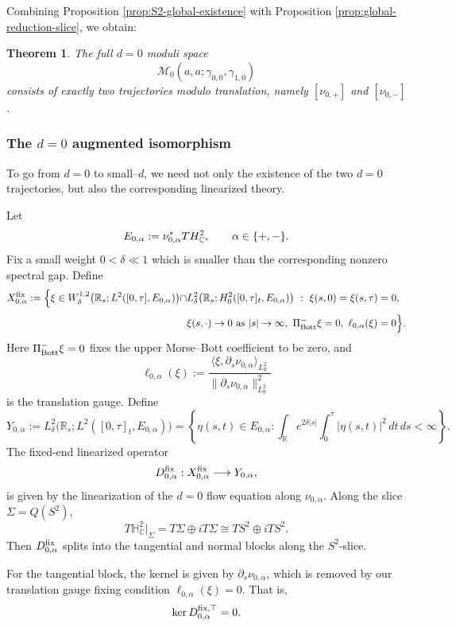 \documentclass[11pt]{amsart}
\theoremstyle{plain}
\newtheorem{thm}{Theorem}[section]
\theoremstyle{definition}
\newcommand{\R}{\mathbb{R}}
\newcommand{\C}{\mathbb{C}}
\newcommand{\HH}{\mathbb{H}}
\begin{document}
Combining Proposition \ref{prop:S2-global-existence} with Proposition \ref{prop:global-reduction-slice}, we obtain:

\begin{thm}\label{thm:exact-two-d0}
The full $d=0$ moduli space
\[
\mathcal{M}_0(a,a;\gamma_{0,0},\gamma_{1,0})
\]
consists of exactly two trajectories modulo translation, namely $[\nu_{0,+}]$ and $[\nu_{0,-}]$.
\end{thm}



\subsubsection{The $d=0$ augmented isomorphism}
To go from $d=0$ to small--$d$, we need not only the existence of the two $d=0$ trajectories, but also the corresponding linearized theory.



Let
\[
E_{0,\alpha}:=\nu_{0,\alpha}^{*}T\mathcal\HH_{\C}^2, \qquad \alpha\in\{+,-\}.
\]
Fix a small weight $0<\delta\ll1$ which is smaller than the corresponding nonzero spectral gap.  Define
\[
\begin{aligned}
X^{\rm fix}_{0,\alpha}
:=
\Bigl\{
  \xi\in
  W^{1,2}_{\delta}\bigl(\R_s;L^2([0,\tau],E_{0,\alpha})\bigr)
  \cap&L^2_{\delta}\bigl(\R_s;H^2_0([0,\tau]_t,E_{0,\alpha})\bigr)
  \ :\ \xi(s,0)=\xi(s,\tau)=0,\\[1mm]
  &\xi(s,\cdot)\to0
    \text{ as }|s|\to\infty,~\Pi_{\rm Bott}^{-}\xi=0,~\ell_{0,\alpha}(\xi)=0
\Bigr\}.
\end{aligned}
\]
Here $\Pi_{\rm Bott}^{-}\xi=0$ fixes the upper Morse--Bott coefficient to be zero, and
\[
\ell_{0,\alpha}(\xi):=\frac{
\langle \xi,\partial_s\nu_{0,\alpha}\rangle_{L^2_{\R}}}{\|\partial_s\nu_{0,\alpha}\|^2_{L^2_{\R}}}
\]
is the translation gauge. Define
\[
Y_{0,\alpha}:=L^2_{\delta}\bigl(\R_s;L^2([0,\tau]_t,E_{0,\alpha})\bigr)=
\left\{\eta(s,t)\in E_{0,\alpha}
: \int_{\R}e^{2\delta |s|}
\int_0^\tau |\eta(s,t)|^2\,dt\,ds<\infty
\right\}.
\]
The fixed-end linearized operator 
\[
D^{\rm fix}_{0,\alpha}:X^{\rm fix}_{0,\alpha}\longrightarrow
Y_{0,\alpha},
\]
is given by the linearization of the $d=0$ flow equation along
$\nu_{0,\alpha}$. Along the slice $\Sigma=Q(S^2)$,
\[
T\HH_{\C}^2\big|_{\Sigma}=T\Sigma\oplus iT\Sigma
\cong TS^2\oplus iTS^2.
\]
Then $D^{\rm fix}_{0,\alpha}$ splits into the tangential and normal blocks along the $S^2$-slice. 

For the tangential block, the kernel is given by $\partial_s\nu_{0,\alpha}$, which is removed by our translation gauge fixing condition $\ell_{0,\alpha}(\xi)=0$. That is,
\[\ker D^{\rm{fix},\top}_{0,\alpha}=0.\]
\end{document}
